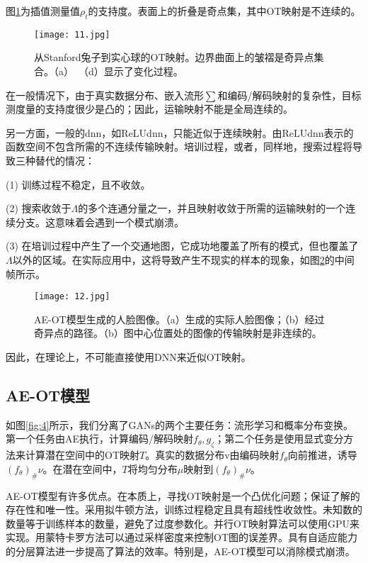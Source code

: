 图\ref{fig:11}为插值测量值$\rho_t$的支持度。表面上的折叠是奇点集，其中OT映射是不连续的。
\begin{figure}[h]
	\centering
	\texttt{[image: 11.jpg]}
	\caption{从Stanford兔子到实心球的OT映射。边界曲面上的皱褶是奇异点集合。（a）~（d）显示了变化过程。}
	\label{fig:11}
\end{figure}

在一般情况下，由于真实数据分布、嵌入流形$\sum$和编码/解码映射的复杂性，目标测度量的支持度很少是凸的；因此，运输映射不能是全局连续的。

另一方面，一般的dnn，如ReLUdnn，只能近似于连续映射。由ReLUdnn表示的函数空间不包含所需的不连续传输映射。培训过程，或者，同样地，搜索过程将导致三种替代的情况：

(1) 训练过程不稳定，且不收敛。

(2) 搜索收敛于$\Lambda$的多个连通分量之一，并且映射收敛于所需的运输映射的一个连续分支。这意味着会遇到一个模式崩溃。

(3) 在培训过程中产生了一个交通地图，它成功地覆盖了所有的模式，但也覆盖了$\Lambda$以外的区域。在实际应用中，这将导致产生不现实的样本的现象，如图\ref{fig:12}的中间帧所示。
\begin{figure}[h]
	\centering
	\texttt{[image: 12.jpg]}
	\caption{AE-OT模型生成的人脸图像。（a）生成的实际人脸图像；（b）经过奇异点的路径。（b）图中心位置处的图像的传输映射是非连续的。}
	\label{fig:12}
\end{figure}


因此，在理论上，不可能直接使用DNN来近似OT映射。

\subsection{AE-OT模型}

如图\ref{fig:4}所示，我们分离了GANs的两个主要任务：流形学习和概率分布变换。第一个任务由AE执行，计算编码/解码映射$f_{\theta}, g_{\zeta}$；第二个任务是使用显式变分方法来计算潜在空间中的OT映射$T$。真实的数据分布v由编码映射$f_{\theta}$向前推进，诱导$(f_{\theta})_{\#} \nu$。在潜在空间中，$T$将均匀分布$\mu$映射到$(f_{\theta})_{\#} \nu$。

AE-OT模型有许多优点。在本质上，寻找OT映射是一个凸优化问题；保证了解的存在性和唯一性。采用拟牛顿方法，训练过程稳定且具有超线性收敛性。未知数的数量等于训练样本的数量，避免了过度参数化。并行OT映射算法可以使用GPU来实现。用蒙特卡罗方法可以通过采样密度来控制OT图的误差界。具有自适应能力的分层算法进一步提高了算法的效率。特别是，AE-OT模型可以消除模式崩溃。